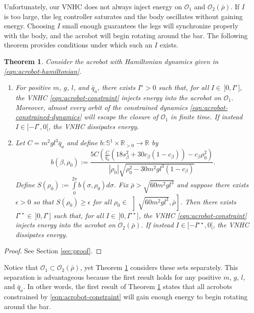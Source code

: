 \documentclass[journal,twoside,web]{ieeecolor}
\newtheorem{thm}{Theorem}%
\newcommand*{\R}{\mathbb{R}}
\newcommand*{\Sone}{\mathbb{S}^1}
\newcommand*{\SxR}{\Sone \times \R}
\begin{document}
{Unfortunately, our VNHC does not always inject energy on \(\mathcal{O}_1\) and
\(\mathcal{O}_2(\bar{\rho})\).
If \(I\) is too large, the leg controller saturates and the body oscillates
without gaining energy.
Choosing \(I\) small enough guarantees the legs will synchronize
properly with the body, and the acrobot will begin rotating around the bar.
The following theorem provides conditions under which such an \(I\) exists.

\begin{thm}\label{thm:acrobot-energy-stabilization}
    Consider the acrobot with Hamiltonian dynamics given in
    \eqref{eqn:acrobot-hamiltonian}.
\begin{enumerate}
    \item For positive \(m\), \(g\), \(l\), and \(\bar{q}_a\), there exists
        \(I^\star > 0\) such that, for all \(I \in \, ]0,I^\star]\), the VNHC
        \eqref{eqn:acrobot-constraint} injects energy into the acrobot on
        \(\mathcal{O}_1\).
        Moreover, almost every orbit of the constrained dynamics 
        \eqref{eqn:acrobot-constrained-dynamics} will escape the closure of
        \(\mathcal{O}_1\) in finite time.
        If instead \(I \in [-I^\star,0[\), the VNHC dissipates energy.
    \item Let \(C = m^2gl^3\bar{q}_a\) and 
        define \(b : \SxR_{> 0} \rightarrow \R\) by
    \[
        b(\beta,\rho_0) := 
        \frac{5C \left(
        \frac{C}{\bar{q}_a}\left(18s_\beta^2 + 30c_\beta(1 - c_\beta)\right)
            - c_\beta\rho_0^2
        \right)}{
        |\rho_0|\sqrt{\rho_0^2 - 30m^2gl^3(1 - c_\beta)}
        }
        .
    \]
        Define 
        \(S(\rho_0) := \int \limits_{0}^{2\pi} b(\sigma,\rho_0)d\sigma\).
        Fix \(\bar{\rho} > \sqrt{60m^2gl^3}\) and
        suppose there exists \(\epsilon > 0\) so that 
        \(S(\rho_0) \geq \epsilon\) for all 
        \(\rho_0 \in \, \left]\sqrt{60m^2gl^3}, \bar{\rho}\right]\).
        Then there exists \(I^{\star\star} \in \, ]0, I^\star]\) such that, for all 
        \(I \in \, ]0,I^{\star\star}]\), the VNHC
        \eqref{eqn:acrobot-constraint} injects energy into the acrobot on
        \(\mathcal{O}_2(\bar{\rho})\).
        If instead \(I \in [-I^{\star\star},0[\), the VNHC dissipates energy.
\end{enumerate}
\end{thm}
\begin{proof}
    See Section \ref{sec:proof}.
\end{proof}

Notice that \(\mathcal{O}_1 \subset \mathcal{O}_2(\bar{\rho})\), yet
Theorem \ref{thm:acrobot-energy-stabilization} considers these sets separately.
This separation is advantageous because the first result holds for any positive
\(m\), \(g\), \(l\), and \(\bar{q}_a\). 
In other words, the first result of Theorem
\ref{thm:acrobot-energy-stabilization} states that all acrobots constrained by
\eqref{eqn:acrobot-constraint} will gain enough energy to begin rotating around
the bar.

}
\end{document}
